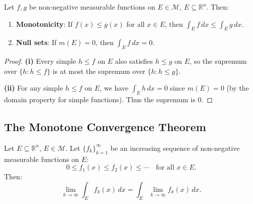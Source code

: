 \documentclass[11pt]{report}
\begin{document}
\begin{propbox}
Let $f, g$ be non-negative measurable functions on $E \in \mathcal{M}$, $E \subseteq \mathbb{R}^n$. Then:
\begin{enumerate}[label=(\roman*)]
\item \textbf{Monotonicity}: If $f(x) \leq g(x)$ for all $x \in E$, then $\int_E f\,dx \leq \int_E g\,dx$.
\item \textbf{Null sets}: If $m(E) = 0$, then $\int_E f\,dx = 0$.
\end{enumerate}
\end{propbox}

\begin{proof}
\textbf{(i)} Every simple $h \leq f$ on $E$ also satisfies $h \leq g$ on $E$, so the supremum over $\{h : h \leq f\}$ is at most the supremum over $\{h : h \leq g\}$.

\textbf{(ii)} For any simple $h \leq f$ on $E$, we have $\int_E h\,dx = 0$ since $m(E) = 0$ (by the domain property for simple functions). Thus the supremum is $0$.
\end{proof}

\subsection{The Monotone Convergence Theorem}

\begin{thmbox}
Let $E \subseteq \mathbb{R}^n$, $E \in \mathcal{M}$. Let $\{f_k\}_{k=1}^{\infty}$ be an increasing sequence of non-negative measurable functions on $E$:
\[
0 \leq f_1(x) \leq f_2(x) \leq \cdots \quad \text{for all } x \in E.
\]
Then:
\[
\lim_{k \to \infty} \int_E f_k(x)\,dx = \int_E \lim_{k \to \infty} f_k(x)\,dx.
\]
\end{thmbox}
\end{document}
